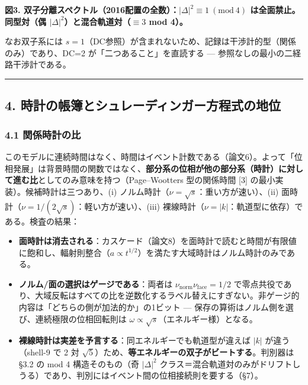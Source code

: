 \documentclass[
]{ltjsarticle}
\providecommand{\tightlist}{%
  \setlength{\itemsep}{0pt}\setlength{\parskip}{0pt}}
\begin{document}
\textbf{図3.
双子分離スペクトル（2016配置の全数）：\(|\Delta|^2\equiv1\ (\mathrm{mod}\ 4)\)
は全面禁止。同型対（偶 \(|\Delta|^2\)）と混合軌道対（\(\equiv3\) mod
4）。}

なお双子系には
\(s=1\)（DC参照）が含まれないため、記録は干渉計的型（関係のみ）であり、DC=2
が「二つあること」を直読する --- 参照なしの最小の二経路干渉計である。

\begin{center}\rule{0.5\linewidth}{0.5pt}\end{center}

\subsection{4.
時計の帳簿とシュレーディンガー方程式の地位}\label{ux6642ux8a08ux306eux5e33ux7c3fux3068ux30b7ux30e5ux30ecux30fcux30c7ux30a3ux30f3ux30acux30fcux65b9ux7a0bux5f0fux306eux5730ux4f4d}

\subsubsection{4.1
関係時計の比}\label{ux95a2ux4fc2ux6642ux8a08ux306eux6bd4}

このモデルに連続時間はなく、時間はイベント計数である（論文6）。よって「位相発展」は背景時間の関数ではなく、\textbf{部分系の位相が他の部分系（時計）に対して進む比}としてのみ意味を持つ（Page--Wootters
型の関係時間 {[}3{]} の最小実装）。候補時計は三つあり、(i)
ノルム時計（\(\nu=\sqrt s\)：重い方が速い）、(ii)
面時計（\(\nu=1/(2\sqrt s)\)：軽い方が速い）、(iii)
裸線時計（\(\nu=|k|\)：軌道型に依存）である。検査の結果：

\begin{itemize}
\tightlist
\item
  \textbf{面時計は消去される}：カスケード（論文8）を面時計で読むと時間が有限値に飽和し、輻射則整合（\(a\propto t^{1/2}\)）を満たす大域時計はノルム時計のみである。
\item
  \textbf{ノルム/面の選択はゲージである}：両者は
  \(\nu_{\mathrm{norm}}\nu_{\mathrm{face}}=1/2\)
  で零点共役であり、大域反転はすべての比を逆数化するラベル替えにすぎない。非ゲージ的内容は「どちらの側が加法的か」の1ビット
  --- 保存の算術はノルム側を選び、連続極限の位相回転則は
  \(\omega\propto\sqrt s\)（エネルギー様）となる。
\item
  \textbf{裸線時計は実差を予言する}：同エネルギーでも軌道型が違えば
  \(|k|\) が違う（shell-9 で 2 対
  \(\sqrt5\)）ため、\textbf{等エネルギーの双子がビートする}。判別器は
  §3.2 の mod 4 構造そのもの（奇 \(|\Delta|^2\)
  クラス＝混合軌道対のみがドリフトしうる）であり、判別にはイベント間の位相接続則を要する（§7）。
\end{itemize}
\end{document}
